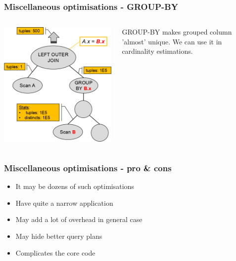 \documentclass{beamer}
\begin{document}
\begin{frame}[fragile]\frametitle{Miscellaneous optimisations - GROUP-BY}
\begin{columns}[T]\begin{column}{0.6\textwidth}
  \includegraphics[scale=0.5]{pics/group-by-unique.png}
\end{column}\begin{column}{0.4\textwidth}
GROUP-BY makes grouped column 'almost' unique. We can use it in cardinality estimations.
\end{column}\end{columns}
\end{frame}

\begin{frame}[fragile]\frametitle{Miscellaneous optimisations - pro \& cons}
\begin{itemize}
  \item It may be dozens of such optimisations
  \item Have quite a narrow application
  \item May add a lot of overhead in general case
  \item May hide better query plans
  \item Complicates the core code
\end{itemize}
\end{frame}
\end{document}
